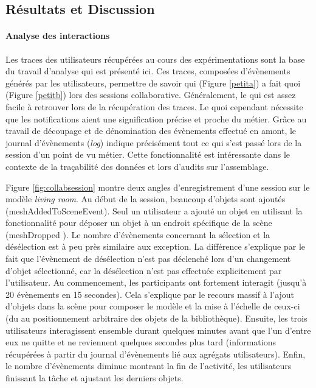 \subsection{Résultats et Discussion}
\label{sec:res}


\paragraph{Analyse des interactions}
Les traces des utilisateurs récupérées au cours des expérimentations sont la base 
du travail d'analyse qui est présenté ici. Ces traces, composées d'évènements 
générés par les utilisateurs, permettre de savoir qui (Figure \ref{petita}) a fait quoi 
(Figure \ref{petitb}) lors des sessions collaborative. Généralement, le \og qui\fg{} 
est assez facile à retrouver lors de la récupération des traces. Le \og quoi\fg{} 
cependant nécessite que les notifications aient une signification précise et proche 
du métier. Grâce au travail de découpage et de dénomination des évènements 
effectué en amont, le journal d'évènements (\textit{log}) indique précisément tout 
ce 
qui s'est passé lors de la session d'un point de vu métier. Cette fonctionnalité est 
intéressante dans le contexte de la traçabilité des données et lors d'audits sur 
l'assemblage. 

Figure \ref{fig:collabsession} montre deux angles d'enregistrement d'une session 
sur le modèle \textit{living room}. Au début de la session, beaucoup d'objets sont 
ajoutés (meshAddedToSceneEvent). Seul un utilisateur a ajouté un objet en 
utilisant la fonctionnalité pour déposer un objet à un endroit spécifique de la scène 
(meshDropped ). Le nombre d'évènements concernant la sélection et 
la désélection est à peu près similaire aux exception. La différence s'explique par 
le fait que l'évènement de désélection n'est pas déclenché lors d'un changement 
d'objet sélectionné, car la désélection n'est pas effectuée explicitement par 
l'utilisateur. Au commencement, les participants ont fortement interagit (jusqu'à 20 
évènements en 15 secondes). Cela s'explique par le recours massif à l'ajout 
d'objets dans la scène pour composer le modèle et la mise à l'échelle de ceux-ci 
(du au positionnement arbitraire des objets de la bibliothèque). Ensuite, les trois 
utilisateurs interagissent ensemble durant quelques minutes avant que l'un d'entre 
eux ne quitte et ne reviennent quelques secondes plus tard (informations 
récupérées à partir du journal d'évènements lié aux agrégats utilisateurs). Enfin, le 
nombre d'évènements diminue montrant la fin de l'activité, les utilisateurs finissant 
la tâche et ajustant les derniers objets.


